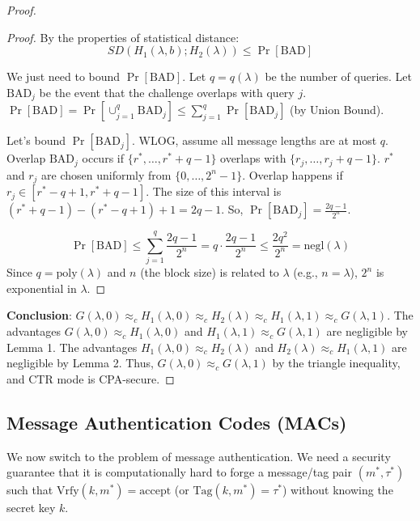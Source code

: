 \documentclass[11pt, a4paper]{article}
\newcommand{\negl}{\text{negl}}
\newcommand{\poly}{\text{poly}}
\begin{document}
\begin{proof}
\begin{proof}
By the properties of statistical distance:
$$ SD(H_1(\lambda, b); H_2(\lambda)) \le \Pr[\text{BAD}] $$ 

We just need to bound $\Pr[\text{BAD}]$. Let $q = q(\lambda)$ be the number of queries.
Let $\text{BAD}_j$ be the event that the challenge overlaps with query $j$. 
$\Pr[\text{BAD}] = \Pr[\cup_{j=1}^q \text{BAD}_j] \le \sum_{j=1}^q \Pr[\text{BAD}_j]$ (by Union Bound). 

Let's bound $\Pr[\text{BAD}_j]$. WLOG, assume all message lengths are at most $q$. 
Overlap $\text{BAD}_j$ occurs if $\{r^*, \dots, r^*+q-1\}$ overlaps with $\{r_j, \dots, r_j+q-1\}$. 
$r^*$ and $r_j$ are chosen uniformly from $\{0, \dots, 2^n-1\}$.
Overlap happens if $r_j \in [r^*-q+1, r^*+q-1]$. 
The size of this interval is $(r^*+q-1) - (r^*-q+1) + 1 = 2q-1$.
So, $\Pr[\text{BAD}_j] = \frac{2q-1}{2^n}$. 

$$ \Pr[\text{BAD}] \le \sum_{j=1}^q \frac{2q-1}{2^n} = q \cdot \frac{2q-1}{2^n} \le \frac{2q^2}{2^n} = \negl(\lambda) $$ 
Since $q = \poly(\lambda)$ and $n$ (the block size) is related to $\lambda$ (e.g., $n=\lambda$), $2^n$ is exponential in $\lambda$.
\end{proof}

\textbf{Conclusion}:
$G(\lambda, 0) \approx_c H_1(\lambda, 0) \approx_c H_2(\lambda) \approx_c H_1(\lambda, 1) \approx_c G(\lambda, 1)$. 
The advantages $G(\lambda, 0) \approx_c H_1(\lambda, 0)$ and $H_1(\lambda, 1) \approx_c G(\lambda, 1)$ are negligible by Lemma 1.
The advantages $H_1(\lambda, 0) \approx_c H_2(\lambda)$ and $H_2(\lambda) \approx_c H_1(\lambda, 1)$ are negligible by Lemma 2.
Thus, $G(\lambda, 0) \approx_c G(\lambda, 1)$ by the triangle inequality, and CTR mode is CPA-secure. 
\end{proof}

\subsection{Message Authentication Codes (MACs)}

We now switch to the problem of message authentication. 
We need a security guarantee that it is computationally hard to forge a message/tag pair $(m^*, \tau^*)$ such that $\text{Vrfy}(k, m^*) = \text{accept}$ (or $\text{Tag}(k, m^*) = \tau^*$) without knowing the secret key $k$. 
\end{document}

